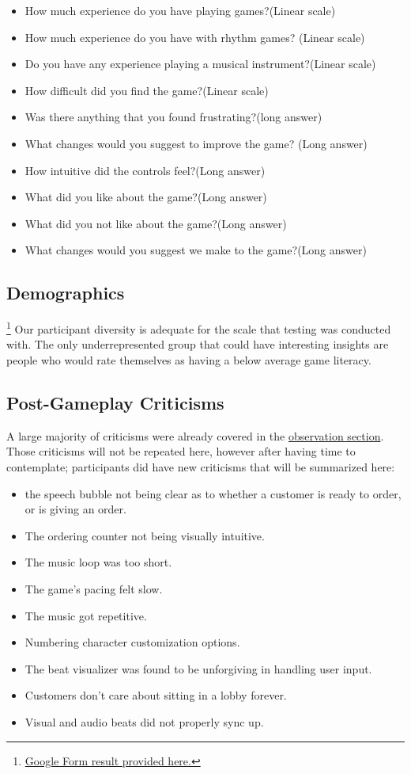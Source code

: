 \documentclass[twoside,twocolumn]{article}
\begin{document}
\begin{itemize}
\item How much experience do you have playing games?(Linear scale)
\item How much experience do you have with rhythm games? (Linear scale)
\item Do you have any experience playing a musical instrument?(Linear scale)
\item How difficult did you find the game?(Linear scale)
\item Was there anything that you found frustrating?(long answer)
\item What changes would you suggest to improve the game? (Long answer)
\item How intuitive did the controls feel?(Long answer)
\item What did you like about the game?(Long answer)
\item What did you not like about the game?(Long answer)
\item What changes would you suggest we make to the game?(Long answer)
\end{itemize}
\subsection{Demographics}\footnote{\hyperlink{https://docs.google.com/spreadsheets/d/1ANOVLghsAPeU3L3zo1TeeCbxSlEFg69GmU0cMx_n9CA/edit?usp=sharing}{Google Form result provided here.}}
Our participant diversity is adequate for the scale that testing was conducted with.
The only underrepresented group  that could have interesting insights are people who would
rate themselves as having a below average game literacy.
\subsection{Post-Gameplay Criticisms}
A large majority of criticisms were already covered in the \hyperlink{section.3}{observation section}. Those
criticisms will not be repeated here, however after having time to contemplate; participants did
have new criticisms that will be summarized here:
\begin{itemize}
    \item the speech bubble not being clear as to whether a customer is ready to order, or is giving an order.
    \item The ordering counter not being visually intuitive.
    \item The music loop was too short.
    \item The game's pacing felt slow.
    \item The music got repetitive.
    \item Numbering character customization options.
    \item The beat visualizer was found to be unforgiving in handling user input.
    \item Customers don't care about sitting in a lobby forever.
    \item Visual and audio beats did not properly sync up.
\end{itemize}
\end{document}
